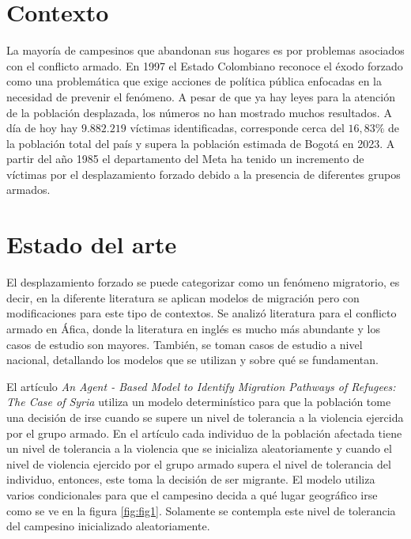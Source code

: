\documentclass{article}
\begin{document}
\section{Contexto}

La mayoría de campesinos que abandonan sus hogares es por problemas asociados con el conflicto armado. En 1997 el Estado Colombiano reconoce el éxodo forzado como una problemática que exige acciones de política pública enfocadas en la necesidad de prevenir el fenómeno\cite{villa2006desplazamiento}. A pesar de que ya hay leyes para la atención de la población desplazada, los números no han mostrado muchos resultados. A día de hoy hay $9.882.219$ víctimas identificadas\cite{unidadvictimas_ruv_2025}, corresponde cerca del $16,83 \%$ de la población total del país\cite{eswiki:165709323} y supera la población estimada de Bogotá en 2023\cite{eswiki:165573820}. A partir del año 1985 el departamento del Meta ha tenido un incremento de víctimas por el desplazamiento forzado debido a la presencia de diferentes grupos armados\cite{solano2020determinantes}.


\section{Estado del arte}

El desplazamiento forzado se puede categorizar como un fenómeno migratorio, es decir, en la diferente literatura se aplican modelos de migración pero con modificaciones para este tipo de contextos. Se analizó literatura para el conflicto armado en Áfica, donde la literatura en inglés es mucho más abundante y los casos de estudio son mayores. También, se toman casos de estudio a nivel nacional, detallando los modelos que se utilizan y sobre qué se fundamentan. 


El artículo \textit{An Agent - Based Model to Identify Migration Pathways of Refugees: The Case of Syria}\cite{hebert2017agent} utiliza un modelo determinístico para que la población tome una decisión de irse cuando se supere un nivel de tolerancia a la violencia ejercida por el grupo armado. En el artículo cada individuo de la población afectada tiene un nivel de tolerancia a la violencia que se inicializa aleatoriamente y cuando el nivel de violencia ejercido por el grupo armado supera el nivel de tolerancia del individuo, entonces, este toma la decisión de ser migrante. El modelo utiliza varios condicionales para que el campesino decida a qué lugar geográfico irse como se ve en la figura \ref{fig:fig1}. Solamente se contempla este nivel de tolerancia del campesino inicializado aleatoriamente.
\end{document}

